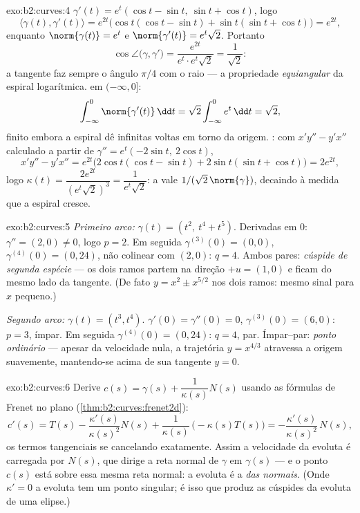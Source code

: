 \begin{solution}{exo:b2:curves:4}
$\gamma'(t) = e^t(\cos t - \sin t,\ \sin t + \cos t)$, logo
\[
\langle \gamma(t), \gamma'(t)\rangle = e^{2t}
\bigl(\cos t(\cos t - \sin t) + \sin t(\sin t + \cos t)\bigr)
= e^{2t},
\]
enquanto $\norm{\gamma(t)} = e^t$ e $\norm{\gamma'(t)} =
e^t\sqrt 2$. Portanto
\[
\cos\angle\bigl(\gamma, \gamma'\bigr)
= \frac{e^{2t}}{e^t \cdot e^t\sqrt2} = \frac{1}{\sqrt2} :
\]
a tangente faz sempre o ângulo $\pi/4$ com o raio --- a propriedade
\emph{equiangular} da espiral logarítmica. 
em $(-\infty, 0]$:
\[
\int_{-\infty}^0 \norm{\gamma'(t)}\,\dd t
= \sqrt2\int_{-\infty}^0 e^t\,\dd t = \sqrt 2 ,
\]
finito embora a espiral dê infinitas voltas em torno da
origem. : com $x'y'' - y'x''$ calculado a partir de $\gamma'' =
e^t(-2\sin t,\ 2\cos t)$,
\[
x'y'' - y'x'' = e^{2t}\bigl(2\cos t(\cos t - \sin t)
+ 2\sin t(\sin t + \cos t)\bigr) = 2e^{2t},
\]
logo $\kappa(t) = \dfrac{2e^{2t}}{(e^t\sqrt2)^3} =
\dfrac{1}{e^t\sqrt2}$: a  vale $1/(\sqrt2\,
\norm{\gamma})$, decaindo à medida que a espiral cresce.
\end{solution}

\begin{solution}{exo:b2:curves:5}
\emph{Primeiro arco:} $\gamma(t) = (t^2,\ t^4 + t^5)$. Derivadas em
$0$: $\gamma'' = (2, 0) \neq 0$, logo $p = 2$. Em seguida $\gamma^{(3)}(0)
= (0, 0)$, $\gamma^{(4)}(0) = (0, 24)$, não colinear com $(2,
0)$: $q = 4$. Ambos pares: \emph{cúspide de segunda espécie} --- os dois
ramos partem na direção $+u = (1,0)$ e ficam do mesmo
lado da tangente. (De fato $y = x^2 \pm x^{5/2}$ nos dois
ramos: mesmo sinal para $x$ pequeno.)

\emph{Segundo arco:} $\gamma(t) = (t^3, t^4)$. $\gamma'(0) =
\gamma''(0) = 0$, $\gamma^{(3)}(0) = (6, 0)$: $p = 3$, ímpar. Em seguida
$\gamma^{(4)}(0) = (0, 24)$: $q = 4$, par. Ímpar--par:
\emph{ponto ordinário} --- apesar da velocidade nula, a
trajetória $y = x^{4/3}$ atravessa a origem suavemente, mantendo-se
acima de sua tangente $y = 0$.
\end{solution}

\begin{solution}{exo:b2:curves:6}
Derive $c(s) = \gamma(s) + \dfrac{1}{\kappa(s)}N(s)$ usando
as fórmulas de Frenet no plano
(\cref{thm:b2:curves:frenet2d}):
\[
c'(s) = T(s) - \frac{\kappa'(s)}{\kappa(s)^2}N(s)
+ \frac{1}{\kappa(s)}\,\bigl(-\kappa(s)T(s)\bigr)
= -\frac{\kappa'(s)}{\kappa(s)^2}\,N(s) ,
\]
os termos tangenciais se cancelando exatamente. Assim a velocidade da
evoluta é carregada por $N(s)$, que dirige a reta normal de
$\gamma$ em $\gamma(s)$ --- e o ponto $c(s)$ está sobre essa mesma
reta normal: a evoluta é a \emph{ das normais}.
(Onde $\kappa' = 0$ a evoluta tem um ponto singular; é isso
que produz as cúspides da evoluta de uma elipse.)
\end{solution}

